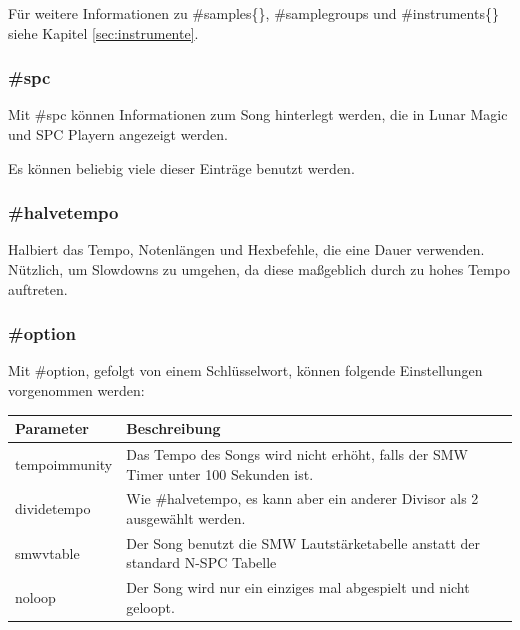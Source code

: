 \medskip



\medskip

Für weitere Informationen zu \#samples\{\}, \#samplegroups und \#instruments\{\} siehe Kapitel \ref{sec:instrumente}.

\subsubsection*{\#spc}

Mit \#spc können Informationen zum Song hinterlegt werden, die in Lunar Magic und SPC Playern angezeigt werden.

\medskip



\medskip

Es können beliebig viele dieser Einträge benutzt werden.

\subsubsection*{\#halvetempo}

Halbiert das Tempo, Notenlängen und Hexbefehle, die eine Dauer verwenden. Nützlich, um Slowdowns zu umgehen, da diese maßgeblich durch zu hohes Tempo auftreten.

\subsubsection*{\#option}

Mit \#option, gefolgt von einem Schlüsselwort, können folgende Einstellungen vorgenommen werden:

\begin{table}[htbp]
	\begin{tabularx}{\textwidth}{|l|X|}
		\hline
		Parameter & Beschreibung\\
		\hline
		tempoimmunity & Das Tempo des Songs wird nicht erhöht, falls der SMW Timer unter 100 Sekunden ist.\\
		\hline
		dividetempo & Wie \#halvetempo, es kann aber ein anderer Divisor als 2 ausgewählt werden.\\
		\hline
		smwvtable & Der Song benutzt die SMW Lautstärketabelle anstatt der standard N-SPC Tabelle\\
		\hline
		noloop & Der Song wird nur ein einziges mal abgespielt und nicht geloopt.\\
		\hline
	\end{tabularx}
\end{table}

